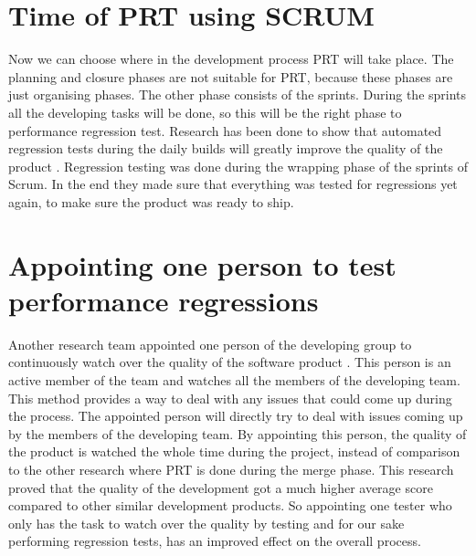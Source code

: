 \section{Time of PRT using SCRUM} Now we can choose where in the development process PRT will take place. The planning and closure phases are not suitable for PRT, because these phases are just organising phases. The other phase consists of the sprints. During the sprints all the developing tasks will be done, so this will be the right phase to performance regression test. Research has been done to show that automated regression tests during the daily builds will greatly improve the quality of the product \cite{Future_of_Scrum}. Regression testing was done during the wrapping phase of the sprints of Scrum. In the end they made sure that everything was tested for regressions yet again, to make sure the product was ready to ship.

\section{Appointing one person to test performance regressions} Another research team appointed one person of the developing group to continuously watch over the quality of the software product \cite{Fully_Distributed_Scrum}. This person is an active member of the team and watches all the members of the developing team. This method provides a way to deal with any issues that could come up during the process. The appointed person will directly try to deal with issues coming up by the members of the developing team. By appointing this person, the quality of the product is watched the whole time during the project, instead of comparison to the other research where PRT is done during the merge phase. This research proved that the quality of the development got a much higher average score compared to other similar development products. So appointing one tester who only has the task to watch over the quality by testing and for our sake performing regression tests, has an improved effect on the overall process.

\section{}

